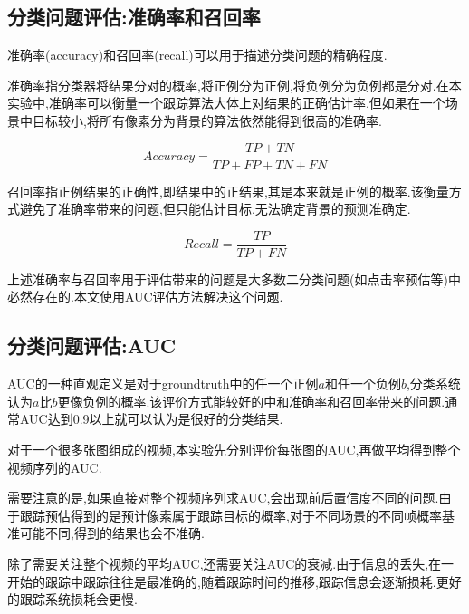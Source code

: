 \subsection{分类问题评估:准确率和召回率}
准确率(accuracy)和召回率(recall)可以用于描述分类问题的精确程度.
\par
准确率指分类器将结果分对的概率,将正例分为正例,将负例分为负例都是分对.在本实验中,准确率可以衡量一个跟踪算法大体上对结果的正确估计率.但如果在一个场景中目标较小,将所有像素分为背景的算法依然能得到很高的准确率.
\par
\begin{equation}\label{equ:accuracy}  Accuracy=\frac{TP+TN}{TP+FP+TN+FN}  \end{equation}
\par
召回率指正例结果的正确性,即结果中的正结果,其是本来就是正例的概率.该衡量方式避免了准确率带来的问题,但只能估计目标,无法确定背景的预测准确定.
\par
\begin{equation}\label{equ:recall}  Recall=\frac{TP}{TP+FN}  \end{equation}
\par
上述准确率与召回率用于评估带来的问题是大多数二分类问题(如点击率预估等)中必然存在的.本文使用AUC评估方法解决这个问题.

\subsection{分类问题评估:AUC} \label{section:auc}
AUC的一种直观定义是对于groundtruth中的任一个正例$a$和任一个负例$b$,分类系统认为$a$比$b$更像负例的概率.该评价方式能较好的中和准确率和召回率带来的问题.通常AUC达到0.9以上就可以认为是很好的分类结果.
\par
对于一个很多张图组成的视频,本实验先分别评价每张图的AUC,再做平均得到整个视频序列的AUC.
\par
需要注意的是,如果直接对整个视频序列求AUC,会出现前后置信度不同的问题.由于跟踪预估得到的是预计像素属于跟踪目标的概率,对于不同场景的不同帧概率基准可能不同,得到的结果也会不准确.
\par
除了需要关注整个视频的平均AUC,还需要关注AUC的衰减.由于信息的丢失,在一开始的跟踪中跟踪往往是最准确的,随着跟踪时间的推移,跟踪信息会逐渐损耗.更好的跟踪系统损耗会更慢.